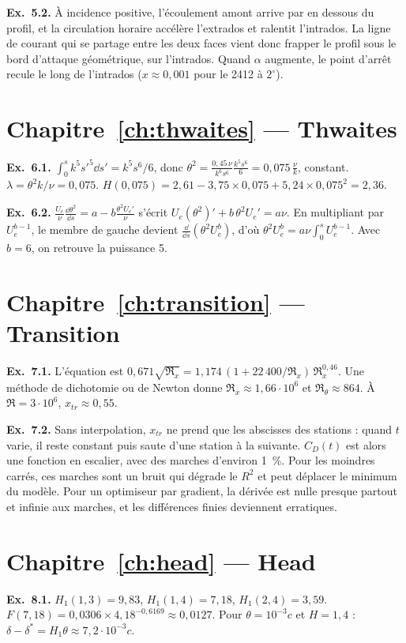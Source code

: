 \textbf{Ex.~5.2.} À incidence positive, l'écoulement amont arrive par en dessous du profil, et la circulation horaire accélère l'extrados et ralentit l'intrados. La ligne de courant qui se partage entre les deux faces vient donc frapper le profil sous le bord d'attaque géométrique, sur l'intrados. Quand $\alpha$ augmente, le point d'arrêt recule le long de l'intrados ($x\approx0{,}001$ pour le 2412 à $2^\circ$).

\section*{Chapitre~\ref{ch:thwaites} — Thwaites}
\textbf{Ex.~6.1.} $\int_0^sk^5s'^5\dd s'=k^5s^6/6$, donc $\theta^2=\frac{0{,}45\,\nu}{k^6s^6}\frac{k^5s^6}{6}=0{,}075\,\frac{\nu}{k}$, constant. $\lambda=\theta^2k/\nu=0{,}075$. $H(0{,}075)=2{,}61-3{,}75\times0{,}075+5{,}24\times0{,}075^2=2{,}36$.

\textbf{Ex.~6.2.} $\frac{U_e}{\nu}\frac{\dd\theta^2}{\dd s}=a-b\frac{\theta^2U_e'}{\nu}$ s'écrit $U_e(\theta^2)'+b\,\theta^2U_e'=a\nu$. En multipliant par $U_e^{b-1}$, le membre de gauche devient $\frac{\dd}{\dd s}(\theta^2U_e^b)$, d'où $\theta^2U_e^b=a\nu\int_0^sU_e^{b-1}$. Avec $b=6$, on retrouve la puissance 5.

\section*{Chapitre~\ref{ch:transition} — Transition}
\textbf{Ex.~7.1.} L'équation est $0{,}671\sqrt{\Re_x}=1{,}174\,(1+22\,400/\Re_x)\,\Re_x^{0{,}46}$. Une méthode de dichotomie ou de Newton donne $\Re_x\approx1{,}66\cdot10^6$ et $\Re_\theta\approx864$. À $\Re=3\cdot10^6$, $x_{tr}\approx0{,}55$.

\textbf{Ex.~7.2.} Sans interpolation, $x_{tr}$ ne prend que les abscisses des stations : quand $t$ varie, il reste constant puis saute d'une station à la suivante. $C_D(t)$ est alors une fonction en escalier, avec des marches d'environ 1~\%. Pour les moindres carrés, ces marches sont un bruit qui dégrade le $R^2$ et peut déplacer le minimum du modèle. Pour un optimiseur par gradient, la dérivée est nulle presque partout et infinie aux marches, et les différences finies deviennent erratiques.

\section*{Chapitre~\ref{ch:head} — Head}
\textbf{Ex.~8.1.} $H_1(1{,}3)=9{,}83$, $H_1(1{,}4)=7{,}18$, $H_1(2{,}4)=3{,}59$. $F(7{,}18)=0{,}0306\times4{,}18^{-0{,}6169}\approx0{,}0127$. Pour $\theta=10^{-3}c$ et $H=1{,}4$ : $\delta-\delta^*=H_1\theta\approx7{,}2\cdot10^{-3}c$.

